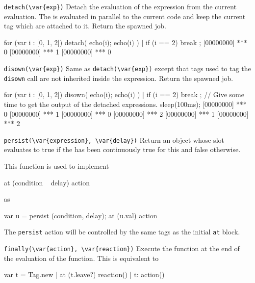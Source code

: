 \begin{urbiscriptapi}

\item \lstinline|detach(\var{exp})|
  Detach the evaluation of the expression  from the current
  evaluation.  The  is evaluated in parallel to the current code
  and keep the current tag which are attached to it.
  Return the spawned job.

\begin{urbiscript}
for (var i : [0, 1, 2])
{
  detach({
    echo(i);
    echo(i)
  }) |
  if (i == 2)
    break
};
[00000000] *** 0
[00000000] *** 1
[00000000] *** 0
\end{urbiscript}

\item \lstinline|disown(\var{exp})|%
  Same as \lstinline|detach(\var{exp})| except that tags used to tag
  the \lstinline|disown| call are not inherited inside the expression.
  Return the spawned job.

\begin{urbiscript}
for (var i : [0, 1, 2])
{
  disown({
    echo(i);
    echo(i)
  }) |
  if (i == 2)
    break
};
// Give some time to get the output of the detached expressions.
sleep(100ms);
[00000000] *** 0
[00000000] *** 1
[00000000] *** 0
[00000000] *** 2
[00000000] *** 1
[00000000] *** 2
\end{urbiscript}

\item \lstinline|persist(\var{expression}, \var{delay})| Return an
  object whose  slot evaluates to true if the
   has been continuously true for this  and
  false otherwise.

  This function is used to implement

\begin{urbiunchecked}
at (condition ~ delay)
  action
\end{urbiunchecked}

  \noindent
  as

\begin{urbiunchecked}
var u = persist (condition, delay);
at (u.val)
  action
\end{urbiunchecked}

  The \lstinline|persist| action will be controlled by the same tags
  as the initial \lstinline|at| block.


\item \lstinline|finally(\var{action}, \var{reaction})|
  Execute the  function at the end of the evaluation of
  the  function.  This is equivalent to

\begin{urbiunchecked}
{
  var t = Tag.new |
  at (t.leave?)
    reaction() |
  t: action()
}
\end{urbiunchecked}


\end{urbiscriptapi}



